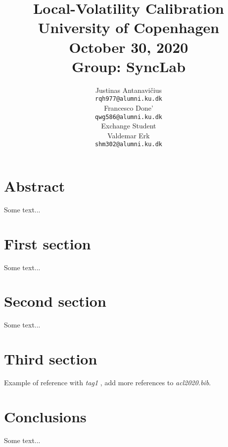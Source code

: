 \documentclass[11pt,a4paper]{article}
\title{Local-Volatility Calibration\\
\large University of Copenhagen\\
\large October 30, 2020\\
\large Group: SyncLab}
\author{Justinas Antanavičius \\
  \texttt{rqh977@alumni.ku.dk} \\\And
  Francesco Done' \\
  \texttt{qwg586@alumni.ku.dk} \\
  \small Exchange Student \\\And
  Valdemar Erk \\
  \texttt{shm302@alumni.ku.dk} \\
 
  }
\date{}
\begin{document}
\maketitle

\section*{Abstract}
Some text...

\section{First section}
Some text...

\section{Second section}
Some text...

\section{Third section}
Example of reference with \textit{tag1} \cite{tag1}, add more references to \textit{acl2020.bib}.

\section*{Conclusions}
Some text...



\end{document}
